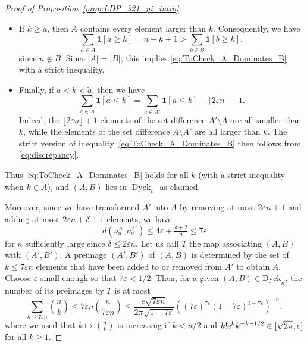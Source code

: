 \documentclass[a4paper,11pt]{amsart}
\newcommand{\eps}{\varepsilon}
\newcommand{\ee}{\textup{e}}
\newcommand{\One}{\bm 1}
\DeclareMathOperator{\Dyck}{Dyck}
\theoremstyle{definition}
\begin{document}
\begin{proof}[Proof of Proposition~\ref{prop:LDP_321_pi_intro}]
\begin{itemize}
    \item If $k \ge \tilde{a}$, then $A$ contains every element larger than $k$. Consequently, we have
    \[\sum_{a \in A} \One[a \ge k]=n-k+1 > \sum_{b \in B} \One[b \ge k],\]
    since $n \notin B$. Since $|A|=|B|$, this implies \eqref{eq:ToCheck_A_Dominates_B} with a strict inequality.
    \item Finally, if $\bar{a} < k < \tilde{a}$, then we have
    \[\sum_{a \in A} \One[a \le k]= \sum_{a \in A'} \One[a \le k] -  \lfloor 2\varepsilon n \rfloor-1.\]
    Indeed, the $\lfloor 2\varepsilon n \rfloor +1$ elements of the set difference $A' \setminus A$ are all smaller than $k$,
    while the elements of the  set difference $A \setminus A'$ are all larger than $k$.
    The strict version of inequality~\eqref{eq:ToCheck_A_Dominates_B} then follows from \eqref{eq:discrepancy}.
\end{itemize}
Thus \eqref{eq:ToCheck_A_Dominates_B} holds for all $k$ (with a strict inequality when $k \in A$), and $(A,B)$ lies in $\Dyck_n$ as claimed.

Moreover, since we have transformed $A'$ into $A$ by removing at most $ 2\varepsilon n +1$ and adding at most $2\varepsilon n+\delta+1$ elements, we have
\[d(\nu_n^A,\nu_n^{A'}) \le 4\varepsilon+\tfrac{\delta+2}n \le 7 \eps\]
for $n$ sufficiently large since $\delta \le 2 \eps n$. 
Let us call $T$ the map associating $(A,B)$ with $(A',B')$. 
A preimage $(A',B')$ of $(A,B)$ is determined by the set of $k \le 7\eps n$ elements that have been added to or removed from $A'$ to obtain $A$. 
Choose $\varepsilon$ small enough so that $7\varepsilon <1/2$. 
Then, for a given $(A,B) \in \textrm{Dyck}_n$, the number of its preimages by $T$ is at most
\[\sum_{k \le 7 \eps n} \binom{n}{k} \le 7 \eps n \binom{n}{7\eps n} \le \frac{ e \sqrt{7  \eps n}}{2\pi \sqrt{1-7\eps}} ( (7\eps)^{7\eps} (1-7\eps)^{1-7\eps})^{-n},\]
where we used that $k \mapsto \binom{n}{k}$ is increasing if $k<n/2$ and $k!\ee^k k^{-k-1/2} \in [\sqrt{2\pi},e]$ for all $k \ge 1$.



\end{proof}
\end{document}
